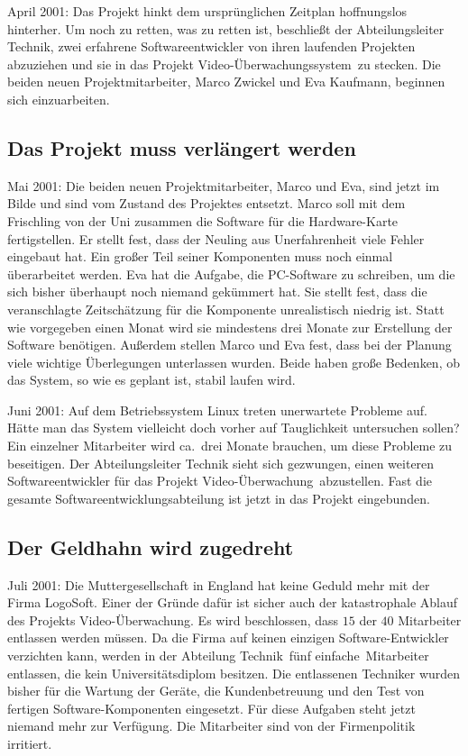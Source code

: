 April 2001: Das Projekt hinkt dem ursprünglichen Zeitplan hoffnungslos
hinterher. Um noch zu retten, was zu retten ist, beschließt der
Abteilungsleiter Technik, zwei erfahrene Softwareentwickler von ihren laufenden
Projekten abzuziehen und sie in das Projekt \glqq Video-Überwachungssystem\grqq\
zu stecken. Die beiden neuen Projektmitarbeiter, Marco Zwickel und Eva
Kaufmann, beginnen sich einzuarbeiten.

\subsection{Das Projekt muss verlängert werden}

Mai 2001: Die beiden neuen Projektmitarbeiter, Marco und Eva, sind jetzt im
Bilde und sind vom Zustand des Projektes entsetzt. Marco soll mit dem
Frischling von der Uni zusammen die Software für die Hardware-Karte
fertigstellen. Er stellt fest, dass der Neuling aus Unerfahrenheit viele Fehler
eingebaut hat. Ein großer Teil seiner Komponenten muss noch einmal überarbeitet
werden. Eva hat die Aufgabe, die PC-Software zu schreiben, um die sich bisher
überhaupt noch niemand gekümmert hat. Sie stellt fest, dass die veranschlagte
Zeitschätzung für die Komponente unrealistisch niedrig ist. Statt wie
vorgegeben einen Monat wird sie mindestens drei Monate zur Erstellung der
Software benötigen. Außerdem stellen Marco und Eva fest, dass bei der Planung
viele wichtige Überlegungen unterlassen wurden. Beide haben große Bedenken, ob
das System, so wie es geplant ist, stabil laufen wird.

Juni 2001: Auf dem Betriebssystem Linux treten unerwartete Probleme auf. Hätte
man das System vielleicht doch vorher auf Tauglichkeit untersuchen sollen? Ein
einzelner Mitarbeiter wird ca.\ drei Monate brauchen, um diese Probleme zu
beseitigen. Der Abteilungsleiter Technik sieht sich gezwungen, einen weiteren
Softwareentwickler für das Projekt \glqq Video-Überwachung\grqq\ abzustellen.
Fast die gesamte Softwareentwicklungsabteilung ist jetzt in das Projekt
eingebunden.


\subsection{Der Geldhahn wird zugedreht}

Juli 2001: Die Muttergesellschaft in England hat keine Geduld mehr mit der
Firma LogoSoft. Einer der Gründe dafür ist sicher auch der katastrophale
Ablauf des Projekts Video-Überwachung. Es wird beschlossen, dass $15$ der $40$
Mitarbeiter entlassen werden müssen. Da die Firma auf keinen einzigen
Software-Entwickler verzichten kann, werden in der Abteilung \glqq Technik\grqq\
fünf \glqq einfache\grqq\ Mitarbeiter entlassen, die kein Universitätsdiplom
besitzen. Die entlassenen Techniker wurden bisher für die Wartung der Geräte,
die Kundenbetreuung und den Test von fertigen Software-Komponenten eingesetzt.
Für diese Aufgaben steht jetzt niemand mehr zur Verfügung. Die Mitarbeiter
sind von der Firmenpolitik irritiert.


